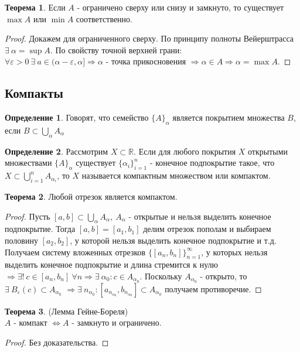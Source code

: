 \documentclass[a4paper, 12pt]{article}
\newcommand{\R}{\mathbb{R}}
\renewcommand{\epsilon}{\varepsilon}
\theoremstyle{definition}
\newtheorem*{definition}{Определение}
\newtheorem*{theorem}{Теорема}
\begin{document}
        \begin{theorem}
            Если $A$ - ограничено сверху или снизу и замкнуто, то существует $\max{A}$ или $\min{A}$ соответственно.
        \end{theorem} 
        \begin{proof}
            Докажем для ограниченного сверху. По принципу полноты Вейерштрасса $\exists\ \alpha=\sup{A}$. По свойству точной верхней грани:\\
            $\forall\epsilon>0\ \exists\ a\in (\alpha-\epsilon, \alpha]\Rightarrow \alpha$ - точка прикосновения $\Rightarrow \alpha \in A\Rightarrow \alpha=\max{A}$.
        \end{proof}
    \subsection{Компакты}
        \begin{definition}
            Говорят, что семейство $\{A\}_{\alpha}$ является покрытием множества $B$, если $B\subset \bigcup\limits_{\alpha}A_{\alpha}$
        \end{definition} 
        \begin{definition}
            Рассмотрим $X\subset \R$. Если для любого покрытия $X$ открытыми множествами $\{A\}_{\alpha}$ существует $\{\alpha_i\}_{i=1}^n$ - конечное подпокрытие такое, что $X\subset \bigcup\limits_{i=1}^n A_{\alpha_i}$, то $X$ называется компактным множеством или компактом.
        \end{definition} 
        \begin{theorem}
            Любой отрезок является компактом.
        \end{theorem} 
        \begin{proof}
            Пусть $[a,b]\subset \bigcup\limits_{\alpha}A_{\alpha},\ A_{\alpha}$ - открытые и нельзя выделить конечное подпокрытие. Тогда $[a,b]=[a_1,b_1]$ делим отрезок пополам и выбираем половину $[a_2,b_2]$, у которой нельзя выделить конечное подпокрытие и т.д. Получаем систему вложенных отрезков $\{[a_n,b_n]\}_{n=1}^{\infty}$, у которых нельзя выделить конечное подпокрытие и длина стремится к нулю $\Rightarrow \exists!\ c\in [a_n,b_n]\ \forall n \Rightarrow \exists\ \alpha_0: c\in A_{\alpha_0}$. Поскольку $A_{\alpha_0}$ - открыто, то $\exists\ B_{\epsilon}(c)\subset A_{\alpha_0}$ $\Rightarrow \exists\ n_{\alpha_0}: [a_{n_{\alpha_0}},b_{n_{\alpha_0}}]\subset A_{\alpha_0}$ получаем противоречие.
        \end{proof} 
        \begin{theorem} (Лемма Гейне-Бореля)\\
            $A$ - компакт $\Leftrightarrow A$ - замкнуто и ограничено.
        \end{theorem} 
        \begin{proof}
            Без доказательства.
        \end{proof}
\end{document}
